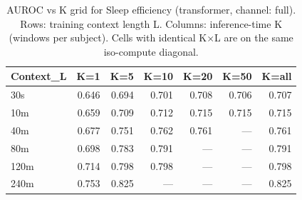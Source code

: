 \begin{table}[ht]
\centering
\caption{AUROC vs K grid for Sleep efficiency (transformer, channel: full). Rows: training context length L. Columns: inference-time K (windows per subject). Cells with identical K×L are on the same iso-compute diagonal.}
\label{tab:kgrid_sleep_efficiency_binary_transformer_full}
\begin{tabular}{lrrrrrr}
\toprule
Context_L & K=1 & K=5 & K=10 & K=20 & K=50 & K=all \\
\midrule
30s & 0.646 & 0.694 & 0.701 & 0.708 & 0.706 & 0.707 \\
10m & 0.659 & 0.709 & 0.712 & 0.715 & 0.715 & 0.715 \\
40m & 0.677 & 0.751 & 0.762 & 0.761 & — & 0.761 \\
80m & 0.698 & 0.783 & 0.791 & — & — & 0.791 \\
120m & 0.714 & 0.798 & 0.798 & — & — & 0.798 \\
240m & 0.753 & 0.825 & — & — & — & 0.825 \\
\bottomrule
\end{tabular}
\end{table}